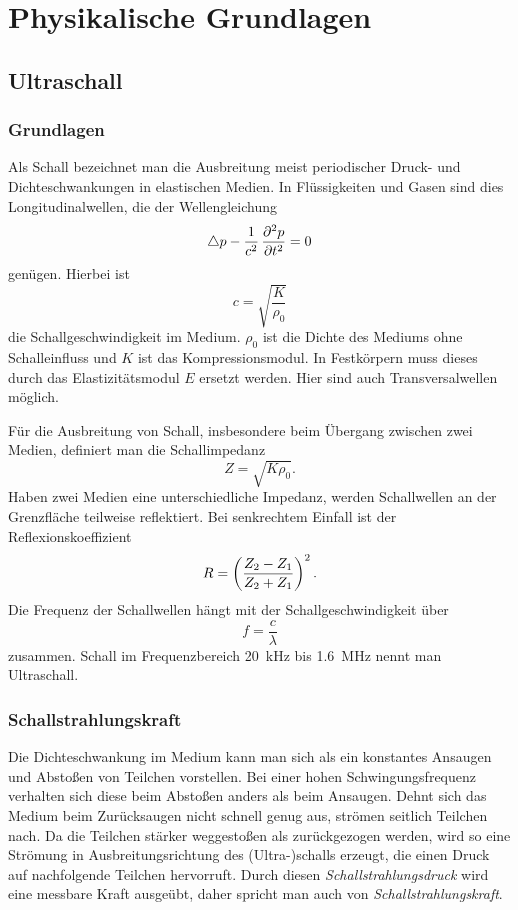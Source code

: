 \documentclass[
    11pt,
    ngerman
]{scrreprt}
\begin{document}
\chapter{Physikalische Grundlagen}

\section{Ultraschall}

\subsection{Grundlagen}

Als Schall bezeichnet man die Ausbreitung meist periodischer Druck- und
Dichteschwankungen in elastischen Medien. In Flüssigkeiten und Gasen sind dies
Longitudinalwellen, die der Wellengleichung
\[
    \laplace p - \frac1{c^2}\dpd[2]pt = 0
\]
genügen. Hierbei ist
\[
    c=\sqrt{\frac{K}{\rho_0}}
\]
die Schallgeschwindigkeit im Medium. $\rho_0$ ist die Dichte des Mediums ohne
Schalleinfluss und $K$ ist das Kompressionsmodul. In Festkörpern muss dieses
durch das Elastizitätsmodul $E$ ersetzt werden. Hier sind auch
Transversalwellen möglich.

Für die Ausbreitung von Schall, insbesondere beim Übergang zwischen zwei
Medien, definiert man die Schallimpedanz
\[
    Z=\sqrt{K\rho_0}.
\]
Haben zwei Medien eine unterschiedliche Impedanz, werden Schallwellen an der
Grenzfläche teilweise reflektiert. Bei senkrechtem Einfall ist der
Reflexionskoeffizient
\[
    R=\del{\frac{Z_2-Z_1}{Z_2+Z_1}}^2.
\]
Die Frequenz der Schallwellen hängt mit der Schallgeschwindigkeit über
\[
    f = \frac c\lambda
\]
zusammen. Schall im Frequenzbereich \SI{20}{\kilo\hertz} bis
\SI{1.6}{\mega\hertz} nennt man Ultraschall.

\subsection{Schallstrahlungskraft}

Die Dichteschwankung im Medium kann man sich als ein konstantes Ansaugen und
Abstoßen von Teilchen vorstellen. Bei einer hohen Schwingungsfrequenz verhalten
sich diese beim Abstoßen anders als beim Ansaugen. Dehnt sich das Medium beim
Zurücksaugen nicht schnell genug aus, strömen seitlich Teilchen nach. Da die
Teilchen stärker weggestoßen als zurückgezogen werden, wird so eine Strömung in
Ausbreitungsrichtung des (Ultra-)schalls erzeugt, die einen Druck auf
nachfolgende Teilchen hervorruft. Durch diesen \emph{Schallstrahlungsdruck}
wird eine messbare Kraft ausgeübt, daher spricht man auch von
\emph{Schallstrahlungskraft}. 
\end{document}
